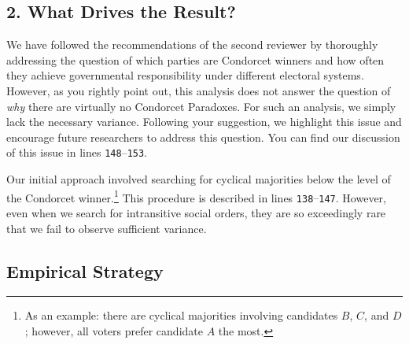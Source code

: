 \documentclass[a4paper, 12pt]{scrartcl}
\begin{document}
\subsection*{2. What Drives the Result?}
We have followed the recommendations of the second reviewer by thoroughly addressing the question of which parties are Condorcet winners and how often they achieve governmental responsibility under different electoral systems. However, as you rightly point out, this analysis does not answer the question of \textit{why} there are virtually no Condorcet Paradoxes. For such an analysis, we simply lack the necessary variance. Following your suggestion, we highlight this issue and encourage future researchers to address this question. You can find our discussion of this issue in lines \texttt{148$–$153}. 

Our initial approach involved searching for cyclical majorities below the level of the Condorcet winner.\footnote{
	As an example: there are cyclical majorities involving candidates $B$, $C$, and $D$; however, all voters prefer candidate $A$ the most.
} This procedure is described in lines \texttt{138$–$147}. However, even when we search for intransitive social orders, they are so exceedingly rare that we fail to observe sufficient variance.

\subsection*{Empirical Strategy}
\end{document}

